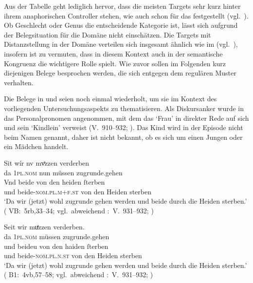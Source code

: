 Aus der Tabelle geht lediglich hervor, dass die meisten Targets sehr kurz
hinter ihrem anaphorischen Controller stehen, wie auch schon für das
\CAO{} festgestellt (vgl.~). Ob Geschlecht
oder Genus die entscheidende Kategorie ist, lässt sich aufgrund der
Belegsituation für die Domäne  nicht einschätzen. Die
Targets mit Distanzstellung in der Domäne  verteilen sich
insgesamt ähnlich wie im \CAO{} (vgl.~), insofern
ist zu vermuten, dass in diesem Kontext auch in der \KC{} semantische
Kongruenz die wichtigere Rolle spielt. Wie zuvor sollen im Folgenden kurz
diejenigen Belege besprochen werden, die sich entgegen dem regulären Muster
verhalten.

Die Belege in  und  seien noch einmal
wiederholt, um sie im Kontext des vorliegenden Unter\-suchungsaspekts zu
thematisieren. Als Diskursanker wurde in  das
Personalpronomen  angenommen, mit dem das  `Frau' in
direkter Rede auf sich und sein  `Kindlein' verweist
(V.~910--932; \cite[98]{schroeder1895}). Das Kind wird in der Episode nicht
beim Namen genannt, daher ist nicht bekannt, ob es sich um einen Jungen oder
ein Mädchen handelt.

\begin{exe}
\ex \label{ex:wipkindelin2}
	\begin{xlist}
	\ex \label{ex:wipkindelin2_1}
		\gll Sit wír nv mvͤzzen verderben \\
			da \textsc{1pl\tsub{\SF/\SX}.nom} nun müssen zugrunde.gehen \\
	\sn \gll Vnd beide von den heiden ſterben \\
			und beide-\textsc{nom.pl.m+f\tsub{\SF/\SX}.st} von den Heiden
				sterben \\
		\trans `Da wir (jetzt) wohl zugrunde gehen werden und beide durch die Heiden sterben.'
			(%
				VB:~5rb,33--34; vgl.~abweichend
				\KC:~V.~931--932;
				\cite[98]{schroeder1895}%
			)
		
	\ex \label{ex:wipkindelin2_2}
		\gll Seit wir muͤzzen verderben. \\
			da \textsc{1pl\tsub{\SF/\SX}.nom} müssen zugrunde.gehen \\
	\sn \gll und beideu von den haiden ſterben \\
			und beide-\textsc{nom.pl.n\tsub{\SF/\SX}.st} von den Heiden
				sterben \\
		\trans `Da wir (jetzt) wohl zugrunde gehen werden und beide durch die Heiden sterben.'
			(%
				B1:~4vb,57--58; vgl.~abweichend
				\KC:~V.~931--932;
				\cite[98]{schroeder1895}%
			)
	\end{xlist}%
\end{exe}

